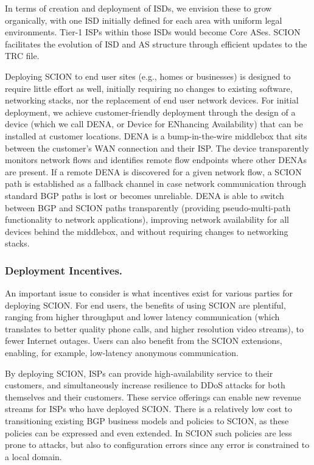 \documentclass[a4paper]{llncs}
\newcommand\SCION{{\small\textsf{SCION}}\xspace}
\begin{document}
In terms of creation and deployment of ISDs, we envision these to grow
organically, with one ISD initially defined for each area with uniform legal
environments. Tier-1 ISPs within those ISDs would
become Core ASes. \SCION facilitates the evolution of ISD and AS structure
through efficient updates to the TRC file. 

Deploying \SCION to end user sites (e.g., homes or businesses) is designed to
require little effort as well, initially requiring no changes to existing software,
networking stacks, nor the replacement of end user network devices. 
For initial deployment, we achieve customer-friendly deployment through the
design of a device (which we call DENA, or Device for ENhancing Availability)
that can be installed at customer locations. DENA is a bump-in-the-wire
middlebox that sits between the customer's WAN connection and their ISP. The
device transparently monitors network flows and identifies remote flow
endpoints where other DENAs are present. If a remote DENA is discovered for a
given network flow, a \SCION path is established as a fallback channel in case
network communication through standard BGP paths is lost or becomes unreliable.
DENA is able to switch between BGP and \SCION paths transparently (providing
pseudo-multi-path functionality to network applications), improving network
availability for all devices behind the middlebox, and without requiring
changes to networking stacks. 




\subsubsection{Deployment Incentives.}
An important issue to consider is what incentives exist for various parties for
deploying \SCION. For end users, the benefits of using \SCION are plentiful,
ranging from higher throughput and lower latency communication (which
translates to better quality phone calls, and higher resolution video streams),
to fewer Internet outages.  Users can also benefit from the \SCION extensions,
enabling, for example, low-latency anonymous communication. 

By deploying \SCION, ISPs can provide high-availability service to their
customers, and simultaneously increase resilience to DDoS attacks for both
themselves and their customers. These service offerings can enable new revenue
streams for ISPs who have deployed \SCION. There is a relatively low cost to
transitioning existing BGP business models and policies to \SCION, as these
policies can be expressed and even extended. In \SCION such policies are less prone to
attacks, but also to configuration errors since any error is constrained to a
local domain.
\end{document}

